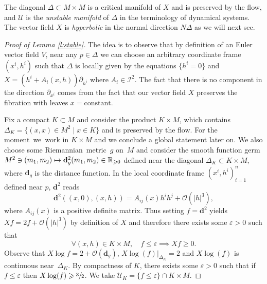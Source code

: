 \documentclass[JEP,XML,SOM,Unicode]{cedram}
\let\pazocal\mathscr
\def\mto{\mathchoice{\longmapsto}{\mapsto}{\mapsto}{\mapsto}}
\theoremstyle{definition}
\newenvironment{refproof}[1]{\begin{proof}[Proof of {#1}]}{\end{proof}}
\let\st\mid
\let\euler X
\begin{document}
The diagonal $\Delta\subset M\times M$
is a critical manifold of $\euler$
and is preserved by the flow, and $\pazocal{U}$
is the \emph{unstable manifold}
of $\Delta$ in the terminology
of dynamical systems.
The vector field $\euler$ is
\emph{hyperbolic} in the normal direction $N\Delta$
as we will next see.

\begin{refproof}{Lemma \ref{l:stable}} The idea is to observe that by definition of an Euler vector field $V$, near any $p\in \Delta$ we can choose an arbitrary coordinate frame $(x^i,h^i)$ such that $\Delta$ is locally given by the equations $\{h^i=0\}$ and $\euler=(h^i+A_i(x,h))\partial_{h^i}$ where $A_i\in \pazocal{I}^2$. The fact that there is no component in the direction $\partial_{x^i}$
comes from the fact that our vector field $\euler$ preserves the fibration with leaves $x=\text{constant}$.

Fix a compact $K\subset M$ and consider the product $K\times M $,
which contains $\Delta_K=\{(x,x)\!\in\! M^2 \st x\!\in\!K\}$ and is preserved by the flow.
For the \hbox{moment we work} in $K\!\times\!M$ and we conclude a global statement later on.
We also choose some \hbox{Riemannian metric~$g$} on~$M$ and consider the smooth function germ $M^2 \ni (m_1,m_2)\mto \mathbf{d}_g^2(m_1,m_2)\in \mathbb{R}_{\geqslant 0} $
defined near the diagonal $\Delta_K\subset K\times M$, where $\mathbf{d}_g$ is the distance function.
In the local coordinate frame $(x^i,h^i)_{i=1}^n$ defined near $p$, $\mathbf{d}^2$ reads
\[
\mathbf{d}^2((x,0),(x,h)) = A_{ij}(x)h^ih^j+\pazocal{O}(\vert h\vert^3),
\]
where $A_{ij}(x)$ is a positive definite matrix. Thus setting $f=\mathbf{d}^2$ yields
$\euler f=2f+\pazocal{O}(\vert h\vert^3)$ by definition of $\euler$
and
therefore there exists some
$\varepsilon>0$ such that
\[
\forall (x,h)\in K\times M,\quad f\leqslant \varepsilon\implies \euler f\geqslant 0.
\]
Observe that $\euler \log f=2+\pazocal{O}(\mathbf{d}_g) $, $\euler \log(f)|_{\Delta_K}=2$ and $\euler \log(f)$ is continuous near~$\Delta_K$.
By compactness of $K$, there exists some $\varepsilon>0$ such that if $f\leqslant \varepsilon$
then $\euler \log(f)\geqslant \sfrac{3}{2}$.
We take $\pazocal{U}_K=\{f\leqslant \varepsilon\}\cap K\times M$.


\end{refproof}
\end{document}
